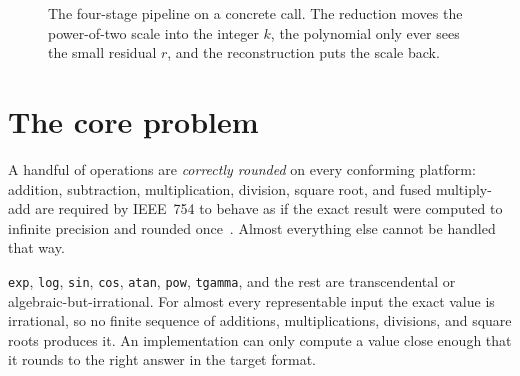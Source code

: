 \documentclass[manuscript, nonacm]{acmart}
\begin{document}
  \begin{figure}[tbp]
    \centering
    \caption{The four-stage pipeline on a concrete call. The reduction
    moves the power-of-two scale into the integer $k$, the polynomial only
    ever sees the small residual $r$, and the reconstruction puts the scale
    back.}
    \label{fig:pipeline}
  \end{figure}



  \section{The core problem}
  \label{sec:core}

  A handful of operations are \emph{correctly rounded} on every conforming
  platform: addition, subtraction, multiplication, division, square root, and
  fused multiply-add are required by IEEE~754 to behave as if the exact result
  were computed to infinite precision and rounded once~\cite{ieee}.
  Almost everything else cannot be handled that way.

  \texttt{exp}, \texttt{log}, \texttt{sin}, \texttt{cos}, \texttt{atan},
  \texttt{pow}, \texttt{tgamma}, and the rest are transcendental or
  algebraic-but-irrational. For almost every representable input the exact
  value is irrational, so no finite sequence of additions, multiplications,
  divisions, and square roots produces it. An implementation can only
  compute a value close enough that it rounds to the right answer in the
  target format.
\end{document}
